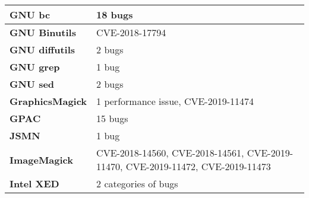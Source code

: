 \begin{longtable}{| p{} | p{} |}
\textbf{GNU bc}         & 18 bugs                                                                                                                                                                                            \\ \hline
\textbf{GNU Binutils}   & CVE-2018-17794                                                                                                                                                                                     \\ \hline
\textbf{GNU diffutils}  & 2 bugs                                                                                                                                                                                             \\ \hline
\textbf{GNU grep}       & 1 bug                                                                                                                                                                                              \\ \hline
\textbf{GNU sed}        & 2 bugs                                                                                                                                                                                             \\ \hline
\textbf{GraphicsMagick} & 1 performance issue, CVE-2019-11474                                                                                                                                                                     \\ \hline
\textbf{GPAC}           & 15 bugs                                                                                                                                                                                            \\ \hline
\textbf{JSMN}           & 1 bug                                                                                                                                                                                              \\ \hline
\textbf{ImageMagick}    & CVE-2018-14560, CVE-2018-14561, CVE-2019-11470, CVE-2019-11472, CVE-2019-11473                                                                                                                                                             \\ \hline
\textbf{Intel XED}      & 2 categories of bugs                                                                                                                                                                               \\ \hline

\end{longtable}
